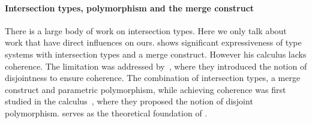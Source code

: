 




\paragraph{Intersection types, polymorphism and the merge construct}

There is a large body of work on intersection types. Here we only talk about
work that have direct influences on ours. \citet{dunfield2014elaborating} shows
significant expressiveness of type systems with intersection types and a merge
construct. However his calculus lacks coherence. The limitation was addressed
by~\citet{oliveira2016disjoint}, where they introduced the notion of
disjointness to ensure coherence. The combination of intersection types, a merge
construct and parametric polymorphism, while achieving coherence was first
studied in the \bname calculus~\cite{alpuimdisjoint}, where they proposed the
notion of disjoint polymorphism. \bname serves as the theoretical foundation of
\name.


